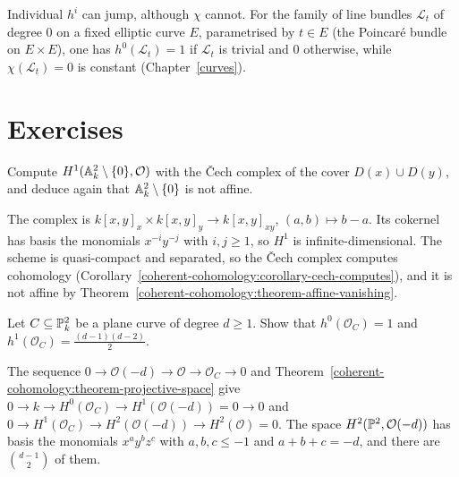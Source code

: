\begin{counterexample}\label{coherent-cohomology:counterexample-jump}
Individual $h^i$ can jump, although $\chi$ cannot. For the family of line bundles $\mathcal{L}_t$ of degree $0$ on a fixed elliptic curve $E$, parametrised
by $t \in E$ (the Poincar\'e bundle on $E \times E$), one has $h^0(\mathcal{L}_t) = 1$ if $\mathcal{L}_t$ is trivial and $0$ otherwise, while
$\chi(\mathcal{L}_t) = 0$ is constant (Chapter~\ref{curves}).
\end{counterexample}

\section{Exercises}\label{coherent-cohomology:section-exercises}

\begin{exercise}\label{coherent-cohomology:exercise-punctured-plane}
Compute $H^1(\mathbb{A}^2_k \setminus \{0\}, \mathcal{O})$ with the \v{C}ech complex of the cover $D(x) \cup D(y)$, and deduce again that $\mathbb{A}^2_k \setminus \{0\}$ is not affine.
\end{exercise}

\begin{solution}
The complex is $k[x, y]_x \times k[x, y]_y \to k[x, y]_{xy}$, $(a, b) \mapsto b - a$. Its cokernel has basis the monomials $x^{-i}y^{-j}$ with $i, j \geq 1$, so $H^1$ is
infinite-dimensional. The scheme is quasi-compact and separated, so the \v{C}ech complex computes cohomology
(Corollary~\ref{coherent-cohomology:corollary-cech-computes}), and it is not affine by Theorem~\ref{coherent-cohomology:theorem-affine-vanishing}.
\end{solution}

\begin{exercise}\label{coherent-cohomology:exercise-plane-curve-cohomology}
Let $C \subseteq \mathbb{P}^2_k$ be a plane curve of degree $d \geq 1$. Show that $h^0(\mathcal{O}_C) = 1$ and $h^1(\mathcal{O}_C) = \frac{(d-1)(d-2)}{2}$.
\end{exercise}

\begin{solution}
The sequence $0 \to \mathcal{O}(-d) \to \mathcal{O} \to \mathcal{O}_C \to 0$ and Theorem~\ref{coherent-cohomology:theorem-projective-space} give
$0 \to k \to H^0(\mathcal{O}_C) \to H^1(\mathcal{O}(-d)) = 0 \to 0$ and $0 \to H^1(\mathcal{O}_C) \to H^2(\mathcal{O}(-d)) \to H^2(\mathcal{O}) = 0$. The space $H^2(\mathbb{P}^2, \mathcal{O}(-d))$ has
basis the monomials $x^ay^bz^c$ with $a, b, c \leq -1$ and $a + b + c = -d$, and there are $\binom{d-1}{2}$ of them.
\end{solution}

